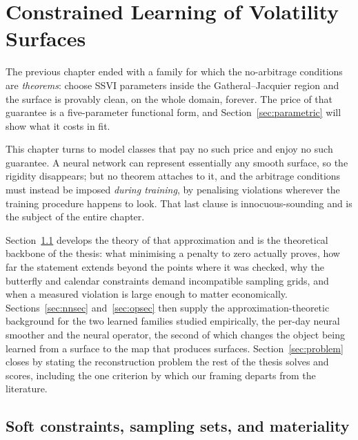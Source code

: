 \chapter{Constrained Learning of Volatility Surfaces}\label{ch:learning}

The previous chapter ended with a family for which the no-arbitrage conditions are
\emph{theorems}: choose SSVI parameters inside the Gatheral--Jacquier region and the surface is
provably clean, on the whole domain, forever. The price of that guarantee is a five-parameter
functional form, and Section~\ref{sec:parametric} will show what it costs in fit.

This chapter turns to model classes that pay no such price and enjoy no such guarantee. A neural
network can represent essentially any smooth surface, so the rigidity disappears; but no theorem
attaches to it, and the arbitrage conditions must instead be imposed \emph{during training}, by
penalising violations wherever the training procedure happens to look. That last clause is
innocuous-sounding and is the subject of the entire chapter.

Section~\ref{sec:softtheory} develops the theory of that approximation and is the theoretical
backbone of the thesis: what minimising a penalty to zero actually proves, how far the statement
extends beyond the points where it was checked, why the butterfly and calendar constraints
demand incompatible sampling grids, and when a measured violation is large enough to matter
economically. Sections~\ref{sec:nnsec} and~\ref{sec:opsec} then supply the
approximation-theoretic background for the two learned families studied empirically, the per-day
neural smoother and the neural operator, the second of which changes the object being learned
from a surface to the map that produces surfaces. Section~\ref{sec:problem} closes by stating
the reconstruction problem the rest of the thesis solves and scores, including the one criterion
by which our framing departs from the literature.

\section{Soft constraints, sampling sets, and materiality}\label{sec:softtheory}

